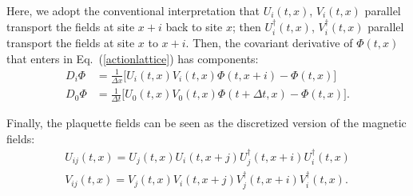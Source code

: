 \documentclass[prd,twocolumn,nofootinbib]{revtex4-1}
\begin{document}
Here, we adopt the conventional interpretation that $U_i(t,x)$, $V_i(t,x)$ 
parallel transport the fields at site $x+i$ back to site $x$;  then
$U_i^\dagger(t,x)$, $V_i^\dagger(t,x)$ parallel transport the fields at 
site $x$ to $x+i$. Then, the covariant derivative of $\Phi(t,x)$ that
enters in Eq.~(\ref{actionlattice}) has components:
\begin{align*}
	D_i \Phi &= \frac{1}{\Delta x} \big[ U_i(t,x) V_i(t,x) \Phi(t,x+i) - \Phi(t,x)\big] \\
	D_0 \Phi &= \frac{1}{\Delta t} \big[ U_0(t,x) V_0(t,x) \Phi(t+\Delta t,x) -\Phi(t,x) \big].
\end{align*}

Finally, the plaquette fields can be seen as the discretized version of 
the magnetic fields: 
\begin{align*}
U_{ij}(t,x) = U_j(t,x) U_i(t,x+j) U_j^\dagger (t,x+i) U_i^\dagger (t,x) \\
V_{ij}(t,x) = V_j(t,x) V_i(t,x+j) V_j^\dagger (t,x+i) V_i^\dagger (t,x).
\end{align*}
\end{document}

